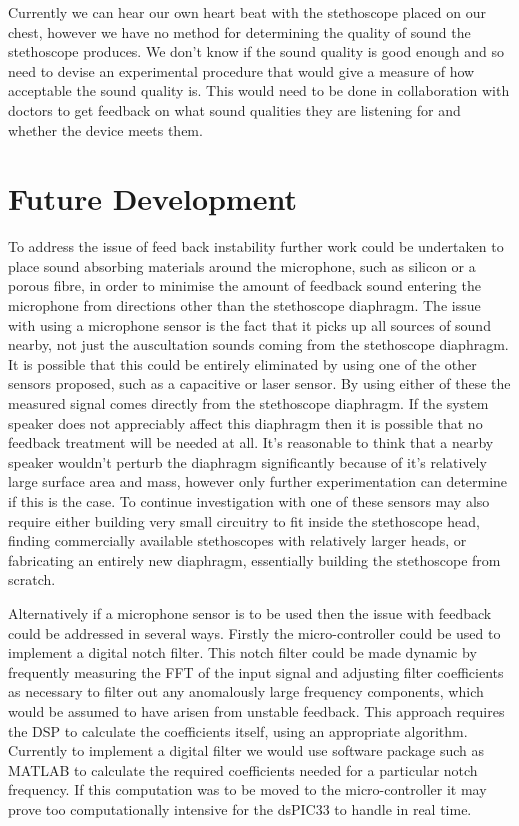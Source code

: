Currently we can hear our own heart beat with the stethoscope placed on our chest, however we have no method for determining the quality of sound the stethoscope produces. We don't know if the sound quality is good enough and so need to devise an experimental procedure that would give a measure of how acceptable the sound quality is. This would need to be done in collaboration with doctors to get feedback on what sound qualities they are listening for and whether the device meets them.
	

\section{Future Development}

To address the issue of feed back instability further work could be undertaken to place sound absorbing materials around the microphone, such as silicon or a porous fibre, in order to minimise the amount of feedback sound entering the microphone from directions other than the stethoscope diaphragm. The issue with using a microphone sensor is the fact that it picks up all sources of sound nearby, not just the auscultation sounds coming from the stethoscope diaphragm. It is possible that this could be entirely eliminated by using one of the other sensors proposed, such as a capacitive or laser sensor. By using either of these the measured signal comes directly from the stethoscope diaphragm. If the system speaker does not appreciably affect this diaphragm then it is possible that no feedback treatment will be needed at all. It's reasonable to think that a nearby speaker wouldn't perturb the diaphragm significantly because of it's relatively large surface area and mass, however only further experimentation can determine if this is the case. To continue investigation with one of these sensors may also require either building very small circuitry to fit inside the stethoscope head, finding commercially available stethoscopes with relatively larger heads, or fabricating an entirely new diaphragm, essentially building the stethoscope from scratch.

Alternatively if a microphone sensor is to be used then the issue with feedback could be addressed in several ways. Firstly the micro-controller could be used to implement a digital notch filter. This notch filter could be made dynamic by frequently measuring the FFT of the input signal and adjusting filter coefficients as necessary to filter out any anomalously large frequency components, which would be assumed to have arisen from unstable feedback. This approach requires the DSP to calculate the coefficients itself, using an appropriate algorithm. Currently to implement a digital filter we would use software package such as MATLAB to calculate the required coefficients needed for a particular notch frequency. If this computation was to be moved to the micro-controller it may prove too computationally intensive for the dsPIC33 to handle in real time. 


